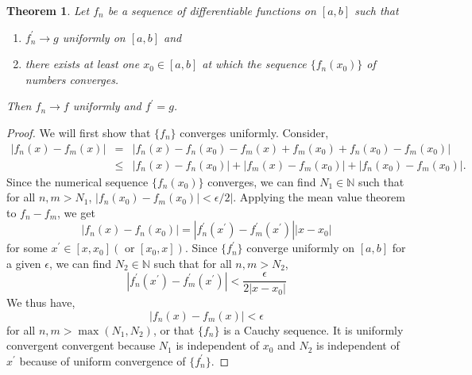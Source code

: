 \documentclass{article}
\theoremstyle{plain}
\newtheorem{thm}{Theorem}
\numberwithin{thm}{section}
\theoremstyle{plain}
\numberwithin{prop}{section}
\theoremstyle{definition}
\numberwithin{defn}{section}
\theoremstyle{remark}
\numberwithin{equation}{section}
\newcommand{\op}{\prime}
\begin{document}
\begin{thm}\label{s5t5}
Let $f_n$ be a sequence of differentiable functions on $[a, b]$ such that
\begin{enumerate}
\item $f_n^\op \rightarrow g$ uniformly on $[a, b]$ and 
\item there exists at least one $x_0 \in [a, b]$ at which the sequence 
$\{f_n(x_0)\}$ of numbers converges.
\end{enumerate}
Then $f_n \rightarrow f$ uniformly and $f^\op = g$.
\end{thm}
\begin{proof}
We will first show that $\{f_n\}$ converges uniformly. Consider,
\begin{eqnarray*}
|f_n(x)-f_m(x)|&=&|f_n(x)-f_n(x_0)-f_m(x)+f_m(x_0)+f_n(x_0)-f_m(x_0)| \\
 &\le& |f_n(x) - f_n(x_0)| + |f_m(x) - f_m(x_0)| + |f_n(x_0) - f_m(x_0)|.
\end{eqnarray*}
Since the numerical sequence $\{f_n(x_0)\}$ converges, we can find $N_1 \in
\mathbb{N}$ such that for all $n, m > N_1$, $|f_n(x_0) - f_m(x_0)| < 
\epsilon/2|$. Applying the mean value theorem to $f_n - f_m$, we get
\[
|f_n(x) - f_n(x_0)| =  |f_n^\op(x^\op) - f_m^\op(x^\op)||x - x_0|
\]
for some $x^\op \in [x, x_0] (\text{ or } [x_0, x])$. Since $\{f_n^\op\}$
converge uniformly on $[a, b]$ for a given $\epsilon$, we can find $N_2 \in
\mathbb{N}$ such that for all $n, m > N_2$,
\[
|f_n^\op(x^\op) - f_m^\op(x^\op)| < \frac{\epsilon}{2|x - x_0|}
\]
We thus have,
\[
|f_n(x) - f_m(x)| < \epsilon
\]
for all $n, m > \max(N_1, N_2)$, or that $\{f_n\}$ is a Cauchy sequence. It is
uniformly convergent convergent because $N_1$ is independent of $x_0$ and $N_2$
is independent of $x^\op$ because of uniform convergence of $\{f_n^\op\}$.


\end{proof}
\end{document}
